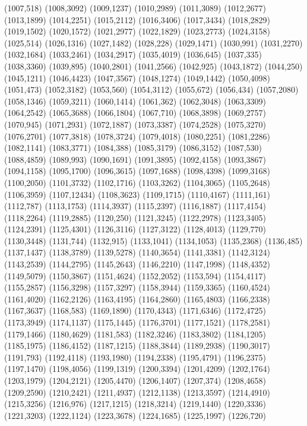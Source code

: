 (1007,518)
(1008,3092)
(1009,1237)
(1010,2989)
(1011,3089)
(1012,2677)
(1013,1899)
(1014,2251)
(1015,2112)
(1016,3406)
(1017,3434)
(1018,2829)
(1019,1502)
(1020,1572)
(1021,2977)
(1022,1829)
(1023,2773)
(1024,3158)
(1025,514)
(1026,1316)
(1027,1482)
(1028,228)
(1029,1471)
(1030,991)
(1031,2270)
(1032,1684)
(1033,2461)
(1034,2917)
(1035,4019)
(1036,645)
(1037,335)
(1038,3360)
(1039,895)
(1040,2801)
(1041,2566)
(1042,925)
(1043,1872)
(1044,250)
(1045,1211)
(1046,4423)
(1047,3567)
(1048,1274)
(1049,1442)
(1050,4098)
(1051,473)
(1052,3182)
(1053,560)
(1054,3112)
(1055,672)
(1056,434)
(1057,2080)
(1058,1346)
(1059,3211)
(1060,1414)
(1061,362)
(1062,3048)
(1063,3309)
(1064,2542)
(1065,3688)
(1066,1804)
(1067,710)
(1068,3898)
(1069,2757)
(1070,945)
(1071,2931)
(1072,1887)
(1073,3387)
(1074,2528)
(1075,3270)
(1076,2701)
(1077,3818)
(1078,3724)
(1079,4018)
(1080,2251)
(1081,2286)
(1082,1141)
(1083,3771)
(1084,388)
(1085,3179)
(1086,3152)
(1087,530)
(1088,4859)
(1089,993)
(1090,1691)
(1091,3895)
(1092,4158)
(1093,3867)
(1094,1158)
(1095,1700)
(1096,3615)
(1097,1688)
(1098,4398)
(1099,3168)
(1100,2050)
(1101,3732)
(1102,1716)
(1103,3262)
(1104,3065)
(1105,2648)
(1106,3959)
(1107,12434)
(1108,3623)
(1109,1715)
(1110,4167)
(1111,161)
(1112,787)
(1113,1753)
(1114,3937)
(1115,2397)
(1116,1887)
(1117,4154)
(1118,2264)
(1119,2885)
(1120,250)
(1121,3245)
(1122,2978)
(1123,3405)
(1124,2391)
(1125,4301)
(1126,3116)
(1127,3122)
(1128,4013)
(1129,770)
(1130,3448)
(1131,744)
(1132,915)
(1133,1041)
(1134,1053)
(1135,2368)
(1136,485)
(1137,1437)
(1138,3789)
(1139,5278)
(1140,3654)
(1141,3381)
(1142,3124)
(1143,2539)
(1144,2795)
(1145,2643)
(1146,2210)
(1147,1998)
(1148,4352)
(1149,5079)
(1150,3867)
(1151,4624)
(1152,2052)
(1153,594)
(1154,4117)
(1155,2857)
(1156,3298)
(1157,3297)
(1158,3944)
(1159,3365)
(1160,4524)
(1161,4020)
(1162,2126)
(1163,4195)
(1164,2860)
(1165,4803)
(1166,2338)
(1167,3637)
(1168,583)
(1169,1890)
(1170,4343)
(1171,6346)
(1172,4725)
(1173,3949)
(1174,1137)
(1175,1445)
(1176,3701)
(1177,1521)
(1178,2581)
(1179,1466)
(1180,4629)
(1181,583)
(1182,3246)
(1183,3802)
(1184,1205)
(1185,1975)
(1186,4152)
(1187,1215)
(1188,3844)
(1189,2938)
(1190,3017)
(1191,793)
(1192,4118)
(1193,1980)
(1194,2338)
(1195,4791)
(1196,2375)
(1197,1470)
(1198,4056)
(1199,1319)
(1200,3394)
(1201,4209)
(1202,1764)
(1203,1979)
(1204,2121)
(1205,4470)
(1206,1407)
(1207,374)
(1208,4658)
(1209,2590)
(1210,2421)
(1211,4937)
(1212,1138)
(1213,3597)
(1214,4910)
(1215,3256)
(1216,976)
(1217,1215)
(1218,3214)
(1219,1440)
(1220,3336)
(1221,3203)
(1222,1124)
(1223,3678)
(1224,1685)
(1225,1997)
(1226,720)
